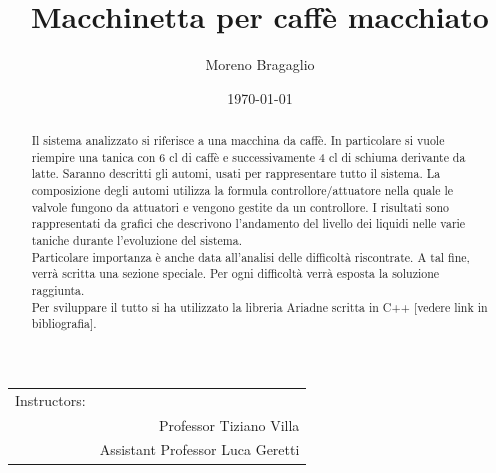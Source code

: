 \documentclass[12pt]{article}
\title{\textbf{Macchinetta per caffè macchiato}} %
\author{Moreno Bragaglio} %
\date{\today} %
\begin{document}
\maketitle %
\begin{center}
\begin{tabular}{l r}
Instructors: \\
& Professor Tiziano Villa \\
& Assistant Professor Luca Geretti
\end{tabular}
\end{center}
\newpage
\tableofcontents

\newpage
\begin{abstract}
Il sistema analizzato si riferisce a una macchina da caffè. In particolare si vuole riempire una tanica con 6 cl di caffè e successivamente 4 cl di schiuma derivante da latte. Saranno descritti gli automi, usati per rappresentare tutto il sistema. La composizione degli automi utilizza la formula controllore/attuatore nella quale le valvole fungono da attuatori e vengono gestite da un controllore.
I risultati sono rappresentati da grafici che descrivono l'andamento del livello dei liquidi nelle varie taniche durante l'evoluzione del sistema. \\
Particolare importanza è anche data all'analisi delle difficoltà riscontrate. A tal fine, verrà scritta una sezione speciale. Per ogni difficoltà verrà esposta la soluzione raggiunta.\\
Per sviluppare il tutto si ha utilizzato la libreria Ariadne scritta in C++ [vedere link in bibliografia].
\end{abstract}


\newpage
\end{document}

